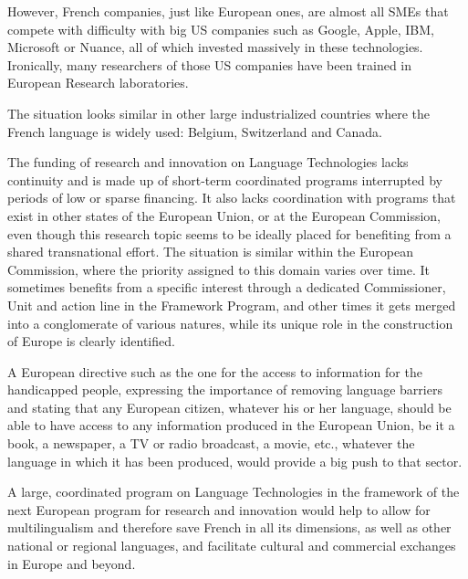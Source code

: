 \begin{multicols}{2}
However, French companies, just like European ones, are almost all SMEs that compete with difficulty with big US companies such as Google, Apple, IBM, Microsoft or Nuance, all of which invested massively in these technologies. Ironically, many researchers of those US companies have been trained in European Research laboratories.

The situation looks similar in other large industrialized countries where the French language is widely used: Belgium, Switzerland and Canada.

The funding of research and innovation on Language Technologies lacks continuity and is made up of short-term coordinated programs interrupted by periods of low or sparse financing. It also lacks coordination with programs that exist in other states of the European Union, or at the European Commission, even though this research topic seems to be ideally placed for benefiting from a shared transnational effort. The situation is similar within the European Commission, where the priority assigned to this domain varies over time. It sometimes benefits from a specific interest through a dedicated Commissioner, Unit and action line in the Framework Program, and other times it gets merged into a conglomerate of various natures, while its unique role in the construction of Europe is clearly identified.

A European directive such as the one for the access to information for the handicapped people, expressing the importance of removing language barriers and stating that any European citizen, whatever his or her language, should be able to have access to any information produced in the European Union, be it a book, a newspaper, a TV or radio broadcast, a movie, etc., whatever the language in which it has been produced, would provide a big push to that sector.

A large, coordinated program on Language Technologies in the framework of the next European program for research and innovation would help to allow for multilingualism and therefore save French in all its dimensions, as well as other national or regional languages, and facilitate cultural and commercial exchanges in Europe and beyond.
\end{multicols}

\clearpage


